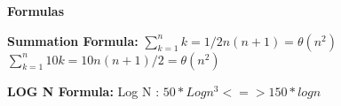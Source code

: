 \documentclass{article}
\begin{document}
\begin{flushleft}
\center\textbf{Formulas}

\begin{flushleft}
\vspace{8mm}\textbf{Summation Formula:}\newline
$\displaystyle\sum_{k=1}^{n} k = 1/2 n(n+1) = \theta(n^2)$
\newline$\displaystyle\sum_{k=1}^{n} 10k = 10n(n+1)/2 = \theta(n^2)$

\vspace{8mm}\textbf{LOG N Formula:}
Log N : $50 * Log n^3 <=> 150 * logn$


\end{flushleft}
\end{flushleft}
\end{document}
